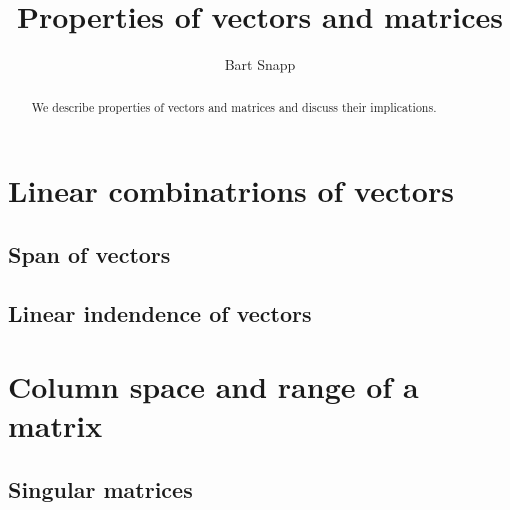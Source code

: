 \documentclass{ximera}
\author{Bart Snapp}
\title{Properties of vectors and matrices}
\begin{document}
\begin{abstract}
  We describe properties of vectors and matrices and discuss their
  implications.
\end{abstract}
\maketitle


\section{Linear combinatrions of vectors}


\subsection{Span of vectors}


\subsection{Linear indendence of vectors}

\section{Column space and range of a matrix}

\subsection{Singular matrices}
\end{document}
